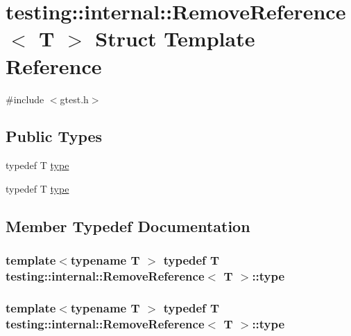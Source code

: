 \hypertarget{structtesting_1_1internal_1_1_remove_reference}{\section{testing\-:\-:internal\-:\-:Remove\-Reference$<$ T $>$ Struct Template Reference}
\label{structtesting_1_1internal_1_1_remove_reference}
}


{\ttfamily \#include $<$gtest.\-h$>$}

\subsection*{Public Types}
\begin{DoxyCompactItemize}
\item 
typedef T \hyperlink{structtesting_1_1internal_1_1_remove_reference_a9ca4f6499579225f7986b789ee4b2895}{type}
\item 
typedef T \hyperlink{structtesting_1_1internal_1_1_remove_reference_a9ca4f6499579225f7986b789ee4b2895}{type}
\end{DoxyCompactItemize}


\subsection{Member Typedef Documentation}
\hypertarget{structtesting_1_1internal_1_1_remove_reference_a9ca4f6499579225f7986b789ee4b2895}{
\subsubsection[{type}]{\setlength{\rightskip}{0pt plus 5cm}template$<$typename T $>$ typedef T {\bf testing\-::internal\-::\-Remove\-Reference}$<$ T $>$\-::{\bf type}}}\label{structtesting_1_1internal_1_1_remove_reference_a9ca4f6499579225f7986b789ee4b2895}
\hypertarget{structtesting_1_1internal_1_1_remove_reference_a9ca4f6499579225f7986b789ee4b2895}{
\subsubsection[{type}]{\setlength{\rightskip}{0pt plus 5cm}template$<$typename T $>$ typedef T {\bf testing\-::internal\-::\-Remove\-Reference}$<$ T $>$\-::{\bf type}}}\label{structtesting_1_1internal_1_1_remove_reference_a9ca4f6499579225f7986b789ee4b2895}


